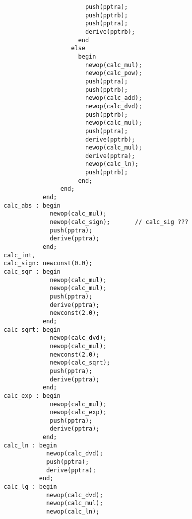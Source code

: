 \begin{refsection}
\begin{lstlisting}
                                     push(pptra);
                                     push(pptrb);
                                     push(pptra);
                                     derive(pptrb);
                                   end
                                 else
                                   begin
                                     newop(calc_mul);
                                     newop(calc_pow);
                                     push(pptra);
                                     push(pptrb);
                                     newop(calc_add);
                                     newop(calc_dvd);
                                     push(pptrb);
                                     newop(calc_mul);
                                     push(pptra);
                                     derive(pptrb);
                                     newop(calc_mul);
                                     derive(pptra);
                                     newop(calc_ln);
                                     push(pptrb);
                                   end;
                              end;
                         end;
              calc_abs : begin
                           newop(calc_mul);
                           newop(calc_sign);       // calc_sig ???
                           push(pptra);
                           derive(pptra);
                         end;
              calc_int,
              calc_sign: newconst(0.0);
              calc_sqr : begin
                           newop(calc_mul);
                           newop(calc_mul);
                           push(pptra);
                           derive(pptra);
                           newconst(2.0);
                         end;
              calc_sqrt: begin
                           newop(calc_dvd);
                           newop(calc_mul);
                           newconst(2.0);
                           newop(calc_sqrt);
                           push(pptra);
                           derive(pptra);
                         end;
              calc_exp : begin
                           newop(calc_mul);
                           newop(calc_exp);
                           push(pptra);
                           derive(pptra);
                         end;
              calc_ln : begin
                          newop(calc_dvd);
                          push(pptra);
                          derive(pptra);
                        end;
              calc_lg : begin
                          newop(calc_dvd);
                          newop(calc_mul);
                          newop(calc_ln);

\end{lstlisting}
\end{refsection}
